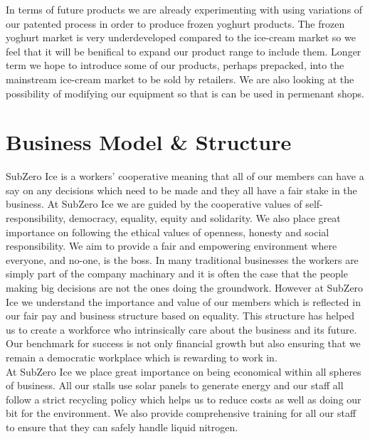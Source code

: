 \documentclass{article}
\begin{document}
  In terms of future products we are already experimenting with using variations of our patented process in order to produce frozen yoghurt products. The frozen yoghurt market is very underdeveloped compared to the ice-cream market so we feel that it will be benifical to expand our product range to include them. Longer term we hope to introduce some of our products, perhaps prepacked, into the mainstream ice-cream market to be sold by retailers. We are also looking at the possibility of modifying our equipment so that is can be used in permenant shops. \\


\section{Business Model \& Structure}

  SubZero Ice is a workers' cooperative meaning that all of our members can have a say on any decisions which need to be made and they all have a fair stake in the business. At SubZero Ice we are guided by the cooperative values of self-responsibility, democracy, equality, equity and solidarity. We also place great importance on following the ethical values of openness, honesty and social responsibility. We aim to provide a fair and empowering environment where everyone, and no-one, is the boss. In many traditional businesses the workers are simply part of the company machinary and it is often the case that the people making big decisions are not the ones doing the groundwork. However at SubZero Ice we understand the importance and value of our members which is reflected in our fair pay and business structure based on equality. This structure has helped us to create a workforce who intrinsically care about the business and its future. Our benchmark for success is not only financial growth but also ensuring that we remain a democratic workplace which is rewarding to work in. \\

  


  At SubZero Ice we place great importance on being economical within all spheres of business. All our stalls use solar panels to generate energy and our staff all follow a strict recycling policy which helps us to reduce costs as well as doing our bit for the environment. We also provide comprehensive training for all our staff to ensure that they can safely handle liquid nitrogen. \\
\end{document}
